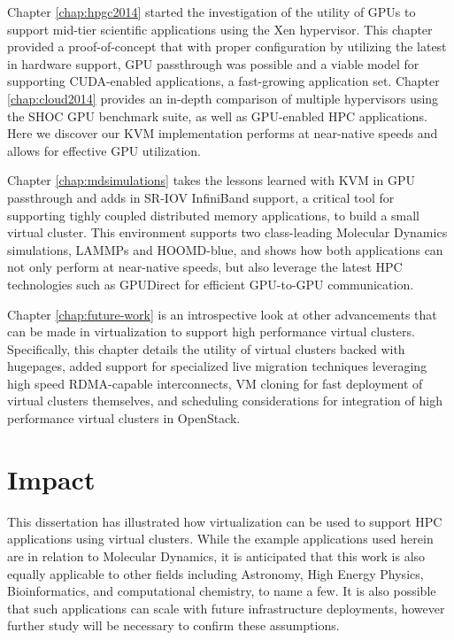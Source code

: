 Chapter \ref{chap:hpgc2014} started the investigation of the utility of GPUs to support mid-tier scientific applications using the Xen hypervisor. This chapter provided a proof-of-concept that with proper configuration by utilizing the latest in hardware support, GPU passthrough was possible and a viable model for supporting CUDA-enabled applications, a fast-growing application set. Chapter \ref{chap:cloud2014} provides an in-depth comparison of multiple hypervisors using the SHOC GPU benchmark suite, as well as GPU-enabled HPC applications. Here we discover our KVM implementation performs at near-native speeds and allows for effective GPU utilization. 

Chapter \ref{chap:mdsimulations} takes the lessons learned with KVM in GPU passthrough and adds in SR-IOV InfiniBand support, a critical tool for supporting tighly coupled distributed memory applications, to build a small virtual cluster. This environment supports two class-leading Molecular Dynamics simulations, LAMMPs and HOOMD-blue, and shows how both applications can not only perform at near-native speeds, but also leverage the latest HPC technologies such as GPUDirect for efficient GPU-to-GPU communication. %

Chapter \ref{chap:future-work} is an introspective look at other advancements that can be made in virtualization to support high performance virtual clusters. Specifically, this chapter details the utility of virtual clusters backed with hugepages, added support for specialized live migration techniques leveraging high speed RDMA-capable interconnects, VM cloning for fast deployment of virtual clusters themselves, and scheduling considerations for integration of high performance virtual clusters in OpenStack.  




\section{Impact}
\label{sec:impact}

This dissertation has illustrated how virtualization can be used to support HPC applications using virtual clusters.  While the example applications used herein are in relation to Molecular Dynamics, it is anticipated that this work is also equally applicable to other fields including Astronomy, High Energy Physics, Bioinformatics, and computational chemistry, to name a few. It is also possible that such applications can scale with future infrastructure deployments, however further study will be necessary to confirm these assumptions.

